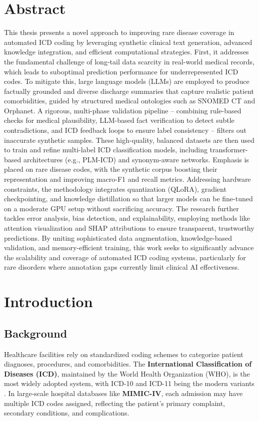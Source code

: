 \documentclass[12pt,a4paper]{report}
\begin{document}
\vfill
\newpage

\chapter*{Abstract}
\label{chap:abstract}

This thesis presents a novel approach to improving rare disease coverage in automated ICD coding by leveraging synthetic clinical text generation, advanced knowledge integration, and efficient computational strategies. First, it addresses the fundamental challenge of long-tail data scarcity in real-world medical records, which leads to suboptimal prediction performance for underrepresented ICD codes. To mitigate this, large language models (LLMs) are employed to produce factually grounded and diverse discharge summaries that capture realistic patient comorbidities, guided by structured medical ontologies such as SNOMED CT and Orphanet. A rigorous, multi-phase validation pipeline – combining rule-based checks for medical plausibility, LLM-based fact verification to detect subtle contradictions, and ICD feedback loops to ensure label consistency – filters out inaccurate synthetic samples. These high-quality, balanced datasets are then used to train and refine multi-label ICD classification models, including transformer-based architectures (e.g., PLM-ICD) and synonym-aware networks. Emphasis is placed on rare disease codes, with the synthetic corpus boosting their representation and improving macro-F1 and recall metrics. Addressing hardware constraints, the methodology integrates quantization (QLoRA), gradient checkpointing, and knowledge distillation so that larger models can be fine-tuned on a moderate GPU setup without sacrificing accuracy. The research further tackles error analysis, bias detection, and explainability, employing methods like attention visualization and SHAP attributions to ensure transparent, trustworthy predictions. By uniting sophisticated data augmentation, knowledge-based validation, and memory-efficient training, this work seeks to significantly advance the scalability and coverage of automated ICD coding systems, particularly for rare disorders where annotation gaps currently limit clinical AI effectiveness.


\chapter{Introduction}
\label{chap:introduction}

\section{Background}
Healthcare facilities rely on standardized coding schemes to categorize patient diagnoses, procedures, and comorbidities. The \textbf{International Classification of Diseases (ICD)}, maintained by the World Health Organization (WHO), is the most widely adopted system, with ICD-10 and ICD-11 being the modern variants \cite{who2019icd11}. In large-scale hospital databases like \textbf{MIMIC-IV}, each admission may have multiple ICD codes assigned, reflecting the patient’s primary complaint, secondary conditions, and complications.
\end{document}
